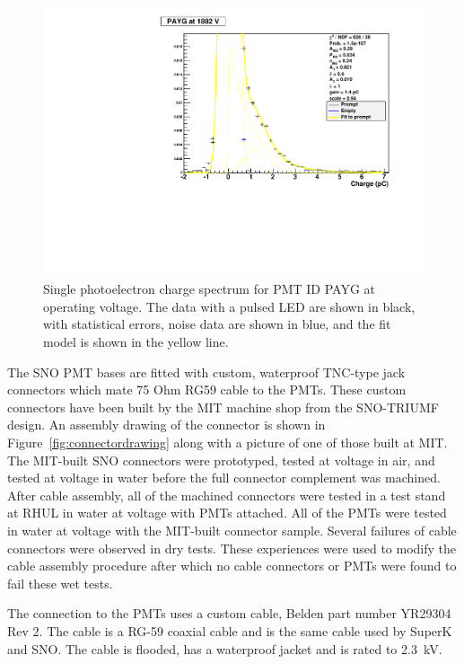 \documentclass{JINST}
\begin{document}
\begin{figure}[ht]
\begin{center}
\includegraphics[width=4.5in]{graphics/PAYG_singlePE.pdf}
\caption{Single photoelectron charge spectrum for PMT ID PAYG at operating voltage. The data with a pulsed LED are shown in black, with statistical errors, noise data are shown in blue, and the fit model is shown in the yellow line.
\label{fig:pmt_spe_q}}
\end{center}
\end{figure}

The SNO PMT bases are fitted with custom, waterproof TNC-type jack
connectors which mate 75 Ohm RG59 cable to the PMTs. These custom
connectors have been built by the MIT machine shop from the SNO-TRIUMF
design. An assembly drawing of the connector is shown in
Figure~\ref{fig:connectordrawing} along with a picture of one of those
built at MIT. The MIT-built SNO
connectors were prototyped, tested at voltage in air, and tested at
voltage in water before the full connector complement was machined.
After cable assembly, all of the machined connectors were tested in
a test stand at RHUL in water at voltage with PMTs attached. All of the
PMTs were tested in water at voltage with the MIT-built connector
sample. Several failures of cable connectors were observed in dry
tests. These experiences were used to modify the cable assembly
procedure after which no cable connectors or PMTs were found to fail
these wet tests.


The connection to the PMTs uses a custom cable, Belden part number YR29304 Rev 2. The cable is a
RG-59 coaxial cable and is the same cable used by SuperK and SNO.
The cable is flooded, has a waterproof jacket and is rated to 2.3~kV.
\end{document}
